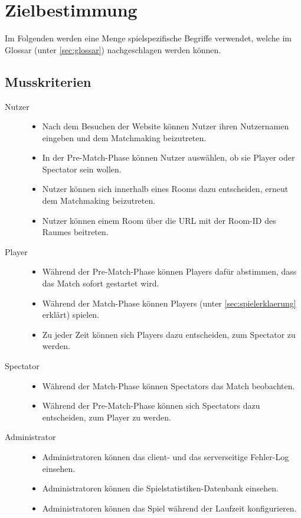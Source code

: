 \section{Zielbestimmung}

\newcommand{\crit}[2]{
	\item[#1] \hfill
		\begin{itemize}
			#2
		\end{itemize}
}

Im Folgenden werden eine Menge spielspezifische Begriffe verwendet, welche im Glossar (unter \ref{sec:glossar}) nachgeschlagen werden können.

\subsection{Musskriterien}
\begin{description}
	\crit{Nutzer}{
		\item Nach dem Besuchen der Website können Nutzer ihren Nutzernamen eingeben und dem Matchmaking beizutreten.
		\item In der Pre-Match-Phase können Nutzer auswählen, ob sie Player oder Spectator sein wollen.
		\item Nutzer können sich innerhalb eines Rooms dazu entscheiden, erneut dem Matchmaking beizutreten.
		\item Nutzer können einem Room über die URL mit der Room-ID des Raumes beitreten.
	}
	\crit{Player}{
		\item Während der Pre-Match-Phase können Players dafür abstimmen, dass das Match sofort gestartet wird.
		\item Während der Match-Phase können Players \vires (unter \ref{sec:spielerklaerung} erklärt) spielen.
		\item Zu jeder Zeit können sich Players dazu entscheiden, zum Spectator zu werden.
	}
	\crit{Spectator}{
		\item Während der Match-Phase können Spectators das Match beobachten.
		\item Während der Pre-Match-Phase können sich Spectators dazu entscheiden, zum Player zu werden.
	}
	\crit{Administrator}{
		\item Administratoren können das client- und das serverseitige Fehler-Log einsehen.
		\item Administratoren können die Spielstatistiken-Datenbank einsehen.
		\item Administratoren können das Spiel während der Laufzeit konfigurieren.
	}
\end{description}

